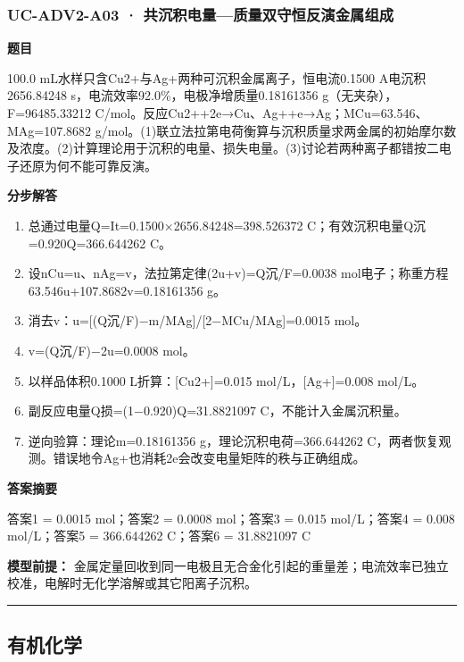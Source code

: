 \documentclass[UTF8,11pt,a4paper]{ctexart}
\begin{document}
\subsubsection*{UC-ADV2-A03 · 共沉积电量—质量双守恒反演金属组成}
\noindent\textbf{题目}\par
100.0 mL水样只含Cu2+与Ag+两种可沉积金属离子，恒电流0.1500 A电沉积2656.84248 s，电流效率92.0\%，电极净增质量0.18161356 g（无夹杂），F=96485.33212 C/mol。反应Cu2++2e→Cu、Ag++e→Ag；MCu=63.546、MAg=107.8682 g/mol。(1)联立法拉第电荷衡算与沉积质量求两金属的初始摩尔数及浓度。(2)计算理论用于沉积的电量、损失电量。(3)讨论若两种离子都错按二电子还原为何不能可靠反演。\par
\medskip\noindent\textbf{分步解答}
\begin{enumerate}
\item 总通过电量Q=It=0.1500×2656.84248=398.526372 C；有效沉积电量Q沉=0.920Q=366.644262 C。
\item 设nCu=u、nAg=v，法拉第定律(2u+v)=Q沉/F=0.0038 mol电子；称重方程63.546u+107.8682v=0.18161356 g。
\item 消去v：u=[(Q沉/F)−m/MAg]/[2−MCu/MAg]=0.0015 mol。
\item v=(Q沉/F)−2u=0.0008 mol。
\item 以样品体积0.1000 L折算：[Cu2+]=0.015 mol/L，[Ag+]=0.008 mol/L。
\item 副反应电量Q损=(1−0.920)Q=31.8821097 C，不能计入金属沉积量。
\item 逆向验算：理论m=0.18161356 g，理论沉积电荷=366.644262 C，两者恢复观测。错误地令Ag+也消耗2e会改变电量矩阵的秩与正确组成。
\end{enumerate}
\noindent\textbf{答案摘要}\par
答案1 = 0.0015 mol；答案2 = 0.0008 mol；答案3 = 0.015 mol/L；答案4 = 0.008 mol/L；答案5 = 366.644262 C；答案6 = 31.8821097 C\par
\noindent\textbf{模型前提：}
金属定量回收到同一电极且无合金化引起的重量差；电流效率已独立校准，电解时无化学溶解或其它阳离子沉积。\par
\medskip\hrule\medskip
\subsection*{有机化学}
\end{document}
